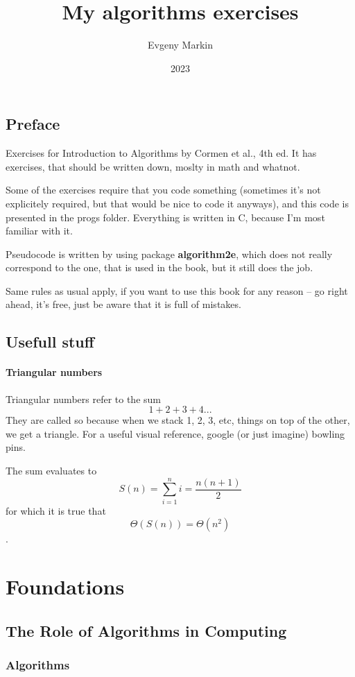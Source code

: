 \documentclass[11pt,oneside,titlepage]{book}
\title{My algorithms exercises}
\author{Evgeny Markin}
\date{2023}
\begin{document}
\maketitle
\tableofcontents

\chapter*{Preface}
Exercises for Introduction to Algorithms by Cormen et al., 4th ed. It has
exercises, that should be written down, moslty in math and whatnot.

Some of the exercises require that you code something (sometimes it's not
explicitely required, but that would be nice to code it anyways), and this
code is presented in the progs folder. Everything is written in C, because I'm most
familiar with it. 

Pseudocode is written by using package \textbf{algorithm2e}, which does not really correspond
to the one, that is used in the book, but it still does the job.

Same rules as usual apply, if you want to use this book for any reason -- go right ahead, it's
free, just be aware that it is full of mistakes.

\chapter*{Usefull stuff}

\subsection{Triangular numbers}
Triangular numbers refer to the sum
$$1 + 2 + 3 + 4 ...$$
They are called so because when we stack 1, 2, 3, etc, things on top of the other, we get a
triangle. For a useful visual reference, google (or just imagine) bowling pins.

The sum evaluates to
$$S(n) = \sum_{i = 1}^{n}{i} = \frac{n(n + 1)}{2}$$
for which it is true that
$$\Theta(S(n)) = \Theta(n^2)$$.

\part{Foundations}

\chapter{The Role of Algorithms in Computing}

\section{Algorithms}
\end{document}
